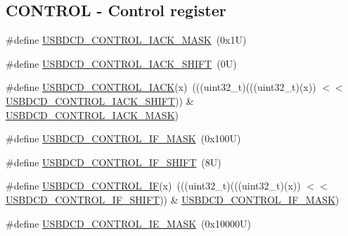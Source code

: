\subsection*{C\+O\+N\+T\+R\+OL -\/ Control register}
\begin{DoxyCompactItemize}
\item 
\#define \mbox{\hyperlink{group___u_s_b_d_c_d___register___masks_ga23b5eadab7d4201af1198723a3b93ae5}{U\+S\+B\+D\+C\+D\+\_\+\+C\+O\+N\+T\+R\+O\+L\+\_\+\+I\+A\+C\+K\+\_\+\+M\+A\+SK}}~(0x1\+U)
\item 
\#define \mbox{\hyperlink{group___u_s_b_d_c_d___register___masks_ga4a96149273b083d48c5917e9b915b92f}{U\+S\+B\+D\+C\+D\+\_\+\+C\+O\+N\+T\+R\+O\+L\+\_\+\+I\+A\+C\+K\+\_\+\+S\+H\+I\+FT}}~(0\+U)
\item 
\#define \mbox{\hyperlink{group___u_s_b_d_c_d___register___masks_gaead33ef0c7d92aed13fd13ca8f8e97de}{U\+S\+B\+D\+C\+D\+\_\+\+C\+O\+N\+T\+R\+O\+L\+\_\+\+I\+A\+CK}}(x)~(((uint32\+\_\+t)(((uint32\+\_\+t)(x)) $<$$<$ \mbox{\hyperlink{group___u_s_b_d_c_d___register___masks_ga4a96149273b083d48c5917e9b915b92f}{U\+S\+B\+D\+C\+D\+\_\+\+C\+O\+N\+T\+R\+O\+L\+\_\+\+I\+A\+C\+K\+\_\+\+S\+H\+I\+FT}})) \& \mbox{\hyperlink{group___u_s_b_d_c_d___register___masks_ga23b5eadab7d4201af1198723a3b93ae5}{U\+S\+B\+D\+C\+D\+\_\+\+C\+O\+N\+T\+R\+O\+L\+\_\+\+I\+A\+C\+K\+\_\+\+M\+A\+SK}})
\item 
\#define \mbox{\hyperlink{group___u_s_b_d_c_d___register___masks_gabedad7b2fec7990f45af8add013a19c7}{U\+S\+B\+D\+C\+D\+\_\+\+C\+O\+N\+T\+R\+O\+L\+\_\+\+I\+F\+\_\+\+M\+A\+SK}}~(0x100\+U)
\item 
\#define \mbox{\hyperlink{group___u_s_b_d_c_d___register___masks_ga576f9434f9947991055f40c1ab3a38c1}{U\+S\+B\+D\+C\+D\+\_\+\+C\+O\+N\+T\+R\+O\+L\+\_\+\+I\+F\+\_\+\+S\+H\+I\+FT}}~(8\+U)
\item 
\#define \mbox{\hyperlink{group___u_s_b_d_c_d___register___masks_ga192fdf885613a642f3388e89fcf5b70a}{U\+S\+B\+D\+C\+D\+\_\+\+C\+O\+N\+T\+R\+O\+L\+\_\+\+IF}}(x)~(((uint32\+\_\+t)(((uint32\+\_\+t)(x)) $<$$<$ \mbox{\hyperlink{group___u_s_b_d_c_d___register___masks_ga576f9434f9947991055f40c1ab3a38c1}{U\+S\+B\+D\+C\+D\+\_\+\+C\+O\+N\+T\+R\+O\+L\+\_\+\+I\+F\+\_\+\+S\+H\+I\+FT}})) \& \mbox{\hyperlink{group___u_s_b_d_c_d___register___masks_gabedad7b2fec7990f45af8add013a19c7}{U\+S\+B\+D\+C\+D\+\_\+\+C\+O\+N\+T\+R\+O\+L\+\_\+\+I\+F\+\_\+\+M\+A\+SK}})
\item 
\#define \mbox{\hyperlink{group___u_s_b_d_c_d___register___masks_ga44f183d0863aeac1154727de57ee6fb6}{U\+S\+B\+D\+C\+D\+\_\+\+C\+O\+N\+T\+R\+O\+L\+\_\+\+I\+E\+\_\+\+M\+A\+SK}}~(0x10000\+U)

\end{DoxyCompactItemize}
